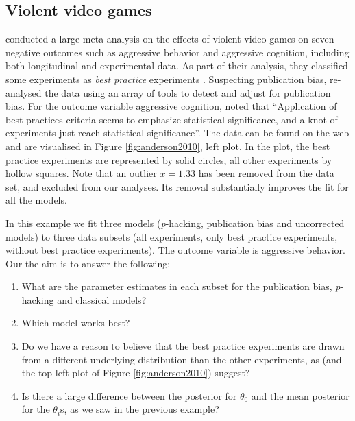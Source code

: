 \documentclass{article}
\theoremstyle{plain}
\theoremstyle{definition}
\begin{document}
\subsection{Violent video games\label{subsec:Anderson}}

\citet{anderson2010violent} conducted a large meta-analysis on the effects of violent video games on seven negative outcomes such as aggressive behavior and aggressive cognition, including both longitudinal and experimental data. As part of their analysis, they classified some experiments as \emph{best practice} experiments  \citep[for more details, see Table 2 of][]{anderson2010violent}. Suspecting publication bias, \citet{hilgard2017overstated} re-analysed the data using an array of tools to detect and adjust for publication bias. For the outcome variable aggressive cognition, \citet{hilgard2017overstated} noted that \enquote{Application of best-practices criteria seems to emphasize statistical significance, and a knot of experiments just reach statistical significance}. The data can be found on the web \citep{Hilgard2017} and are visualised in Figure \ref{fig:anderson2010}, left plot. In the plot, the best practice experiments are represented by solid circles, all other experiments by hollow squares. Note that an outlier $x=1.33$ has been removed from the data set, and excluded from our analyses. Its removal substantially improves the fit for all the models. 

In this example we fit three models (\textit{p}-hacking, publication bias and uncorrected models) to three data subsets (all experiments, only best practice experiments, without best practice experiments). The outcome variable is aggressive behavior. Our the aim is to answer the following:
\begin{enumerate}
\item What are the parameter estimates in each subset for the publication bias, \textit{p}-hacking and classical models?
\item Which model works best?
\item Do we have a reason to believe that the best practice experiments are drawn from a different underlying distribution than the other experiments, as \citet{hilgard2017overstated} (and the top left plot of Figure \ref{fig:anderson2010}) suggest?
\item Is there a large difference between the posterior for $\theta_{0}$ and the mean posterior for the $\theta_{i}$s, as we saw in the previous example?
\end{enumerate}
\end{document}
